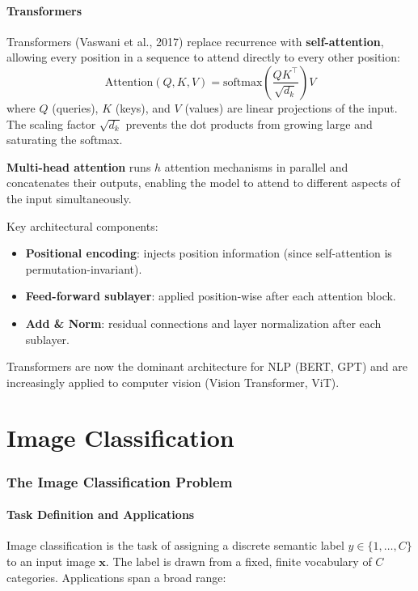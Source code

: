 \documentclass[11pt,a4paper]{article}
\theoremstyle{definition}
\theoremstyle{plain}
\theoremstyle{remark}
\begin{document}
\subsection{Transformers}

Transformers (Vaswani et al., 2017) replace recurrence with \textbf{self-attention}, allowing every position in a sequence to attend directly to every other position:
\[
    \mathrm{Attention}(Q, K, V) = \mathrm{softmax}\!\left(\frac{QK^\top}{\sqrt{d_k}}\right)V
\]
where $Q$ (queries), $K$ (keys), and $V$ (values) are linear projections of the input. The scaling factor $\sqrt{d_k}$ prevents the dot products from growing large and saturating the softmax.

\textbf{Multi-head attention} runs $h$ attention mechanisms in parallel and concatenates their outputs, enabling the model to attend to different aspects of the input simultaneously.

Key architectural components:
\begin{itemize}
    \item \textbf{Positional encoding}: injects position information (since self-attention is permutation-invariant).
    \item \textbf{Feed-forward sublayer}: applied position-wise after each attention block.
    \item \textbf{Add \& Norm}: residual connections and layer normalization after each sublayer.
\end{itemize}

Transformers are now the dominant architecture for NLP (BERT, GPT) and are increasingly applied to computer vision (Vision Transformer, ViT).


\part{Image Classification}

\section{The Image Classification Problem}

\subsection{Task Definition and Applications}

Image classification is the task of assigning a discrete semantic label $y \in \{1,\ldots,C\}$ to an input image $\mathbf{x}$.
The label is drawn from a fixed, finite vocabulary of $C$ categories.
Applications span a broad range:
\end{document}

